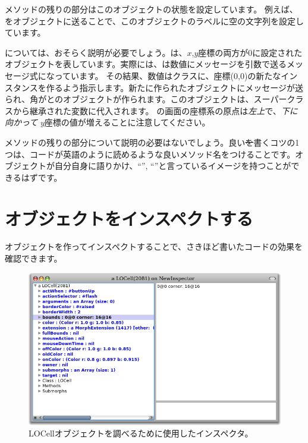 \documentclass[a4paper,10pt,twoside]{book}
\begin{document}
メソッドの残りの部分はこのオブジェクトの状態を設定しています。
例えば、をオブジェクトに送ることで、このオブジェクトのラベルに空の文字列を設定しています。

については、おそらく説明が必要でしょう。は、$x$,$y$座標の両方が0に設定されたオブジェクトを表しています。実際には、は数値にメッセージを引数で送るメッセージ式になっています。
その結果、数値はクラスに、座標(0,0)の新たなインスタンスを作るよう指示します。新たに作られたオブジェクトにメッセージが送られ、角がとのオブジェクトが作られます。このオブジェクトは、スーパークラスから継承された変数に代入されます。
\pharo の画面の座標系の原点は\emph{左上}で、\emph{下に向かって} $y$座標の値が増えることに注意してください。

メソッドの残りの部分について説明の必要はないでしょう。良い\st を書くコツの1つは、コードが英語のように読めるような良いメソッド名をつけることです。オブジェクトが自分自身に語りかけ、``'', ``''と言っているイメージを持つことができるはずです。

\section{オブジェクトをインスペクトする}

オブジェクトを作ってインスペクトすることで、さきほど書いたコードの効果を確認できます。


\begin{figure}[htbp]
   \centering
   \includegraphics[width=\textwidth]{LOCellInspector}
   \caption{LOCellオブジェクトを調べるために使用したインスペクタ。}
\end{figure}
\end{document}
